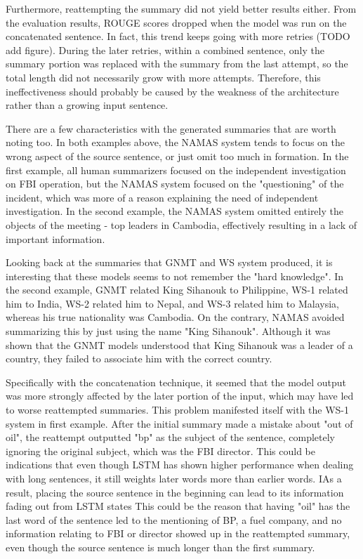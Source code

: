 \documentclass[letterpaper]{article} %
\begin{document}
Furthermore, reattempting the summary did not yield better results either. From the evaluation results, ROUGE scores dropped when the model was run on the concatenated sentence. In fact, this trend keeps going with more retries (TODO add figure). During the later retries, within a combined sentence, only the summary portion was replaced with the summary from the last attempt, so the total length did not necessarily grow with more attempts. Therefore, this ineffectiveness should probably be caused by the weakness of the architecture rather than a growing input sentence.

There are a few characteristics with the generated summaries that are worth noting too. In both examples above, the NAMAS system tends to focus on the wrong aspect of the source sentence, or just omit too much in formation. In the first example, all human summarizers focused on the independent investigation on FBI operation, but the NAMAS system focused on the "questioning" of the incident, which was more of a reason explaining the need of independent investigation. In the second example, the NAMAS system omitted entirely the objects of the meeting - top leaders in Cambodia, effectively resulting in a lack of important information.

Looking back at the summaries that GNMT and WS system produced, it is interesting that these models seems to not remember the "hard knowledge". In the second example, GNMT related King Sihanouk to Philippine, WS-1 related him to India, WS-2 related him to Nepal, and WS-3 related him to Malaysia, whereas his true nationality was Cambodia. On the contrary, NAMAS avoided summarizing this by just using the name "King Sihanouk". Although it was shown that the GNMT models understood that King Sihanouk was a leader of a country, they failed to associate him with the correct country.

Specifically with the concatenation technique, it seemed that the model output was more strongly affected by the later portion of the input, which may have led to worse reattempted summaries. This problem manifested itself with the WS-1 system in first example. After the initial summary made a mistake about "out of oil", the reattempt outputted "bp" as the subject of the sentence, completely ignoring the original subject, which was the FBI director. This could be indications that even though LSTM has shown higher performance when dealing with long sentences, it still weights later words more than earlier words. IAs a result, placing the source sentence in the beginning can lead to its information fading out from LSTM states This could be the reason that having "oil" has the last word of the sentence led to the mentioning of BP, a fuel company, and no information relating to FBI or director showed up in the reattempted summary, even though the source sentence is much longer than the first summary.
\end{document}
